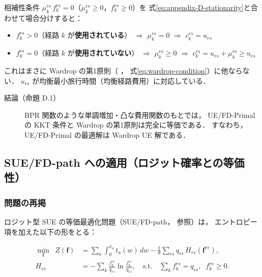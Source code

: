 相補性条件 $\mu_k^{rs}\,f_k^{rs} = 0$（$\mu_k^{rs} \geq 0$，$f_k^{rs} \geq 0$）を
式\eqref{eq:appendix-D-stationarity}と合わせて場合分けすると：

\begin{itemize}
  \item $f_k^{rs} > 0$（経路 $k$ が\textbf{使用されている}）
        $\Rightarrow$ $\mu_k^{rs} = 0$
        $\Rightarrow$ $c_k^{rs} = u_{rs}$
  \item $f_k^{rs} = 0$（経路 $k$ が\textbf{使用されていない}）
        $\Rightarrow$ $\mu_k^{rs} \geq 0$
        $\Rightarrow$ $c_k^{rs} = u_{rs} + \mu_k^{rs} \geq u_{rs}$
\end{itemize}

これはまさに Wardrop の第1原則（ ，
式\eqref{eq:wardrop-condition}）に他ならない．
$u_{rs}$ が均衡最小旅行時間（均衡経路費用）に対応している．

\begin{description}
  \item[結論（命題 D.1）]
    BPR 関数のような単調増加・凸な費用関数のもとでは，
    UE/FD-Primal の KKT 条件と Wardrop の第1原則は完全に等価である．
    すなわち，UE/FD-Primal の最適解は Wardrop UE 解である．
\end{description}

\subsection{SUE/FD-path への適用（ロジット確率との等価性）}
\label{subsec:appendix-D-sue}

\subsubsection*{問題の再掲}

ロジット型 SUE の等価最適化問題（SUE/FD-path， 参照）は，
エントロピー項を加えた以下の形をとる：

\begin{align}
  \min_{\boldsymbol{f}} \;\;
  Z(\boldsymbol{f})
  &= \sum_a \int_0^{x_a} t_a(w)\,dw
     - \frac{1}{\theta}\sum_{rs} q_{rs}\, H_{rs}(\boldsymbol{f}^{rs}),
  \label{eq:appendix-D-sue-obj} \\
  H_{rs}
  &= -\sum_k \frac{f_k^{rs}}{q_{rs}} \ln \frac{f_k^{rs}}{q_{rs}},
  \quad \text{s.t.} \quad
  \sum_k f_k^{rs} = q_{rs},\;\; f_k^{rs} \geq 0.
  \label{eq:appendix-D-sue-entropy}
\end{align}

